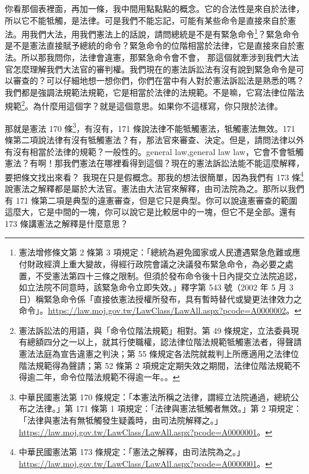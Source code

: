 \hypertarget{w05:cue:31}{}你看那個表裡面，再加一條，我中間用點點點的概念。它的合法性是來自於法律，所以它不能牴觸，是法律。可是我們不能忘記，可能有某些命令是直接來自於憲法。用我們大法，用我們憲法上的話說，請問總統是不是有緊急命令\footnote{憲法增修條文第 2 條第 3 項規定：「總統為避免國家或人民遭遇緊急危難或應付財政經濟上重大變故，得經行政院會議之決議發布緊急命令，為必要之處置，不受憲法第四十三條之限制。但須於發布命令後十日內提交立法院追認，如立法院不同意時，該緊急命令立即失效。」釋字第 543 號（2002 年 5 月 3 日）稱緊急命令係「直接依憲法授權所發布，具有暫時替代或變更法律效力之命令」。\url{https://law.moj.gov.tw/LawClass/LawAll.aspx?pcode=A0000002}。}？緊急命令是不是憲法直接賦予總統的命令？緊急命令的位階相當於法律，它是直接來自於憲法。所以那我問你，法律會違憲，那緊急命令會不會，
\hypertarget{w05:cue:32}{}那這個就牽涉到我們大法官怎麼理解我們大法官的審判權。我們現在的憲法訴訟法有沒有說到緊急命令是可以審查的？可以仔細地想一想你們，你們在當中有人對於憲法訴訟法是熟悉的嗎？我們都是強調法規範法規範，它是相當於法律的法規範。不是嘛，它寫法律位階法規範\footnote{憲法訴訟法的用語，與「命令位階法規範」相對。第 49 條規定，立法委員現有總額四分之一以上，就其行使職權，認法律位階法規範牴觸憲法者，得聲請憲法法庭為宣告違憲之判決；第 55 條規定各法院就裁判上所應適用之法律位階法規範得為聲請；第 52 條第 2 項規定定期失效之期間，法律位階法規範不得逾二年，命令位階法規範不得逾一年。\cite{csfa}。}。為什麼用這個字？就是這個意思。如果你不這樣寫，你只限於法律。

\hypertarget{w05:cue:33}{}那就是憲法 170 條\footnote{中華民國憲法第 170 條規定：「本憲法所稱之法律，謂經立法院通過，總統公布之法律。」第 171 條第 1 項規定：「法律與憲法牴觸者無效。」第 2 項規定：「法律與憲法有無牴觸發生疑義時，由司法院解釋之。」\url{https://law.moj.gov.tw/LawClass/LawAll.aspx?pcode=A0000001}。}，有沒有，171 條說法律不能牴觸憲法，牴觸憲法無效。171 條第二項說法律有沒有牴觸憲法？有，那法官來審查、決定。但是，請問法律以外有沒有相當於法律的規範？一般性的。general law,general law law，它會不會牴觸憲法？有啊！那我們憲法在哪裡看得到這個？現在的憲法訴訟法能不能這麼解釋，要把條文找出來看？
\hypertarget{w05:cue:34}{}我現在只是假概念。那我的想法很簡單，因為我們有 173 條\footnote{中華民國憲法第 173 條規定：「憲法之解釋，由司法院為之。」\url{https://law.moj.gov.tw/LawClass/LawAll.aspx?pcode=A0000001}。}說憲法之解釋都是屬於大法官。憲法由大法官來解釋，由司法院為之。那所以我們有 171 條第二項是典型的違憲審查，但是它只是典型。你可以說違憲審查的範圍這麼大，它是中間的一塊，你可以說它是比較居中的一塊，但它不是全部。還有 173 條講憲法之解釋是什麼意思？

